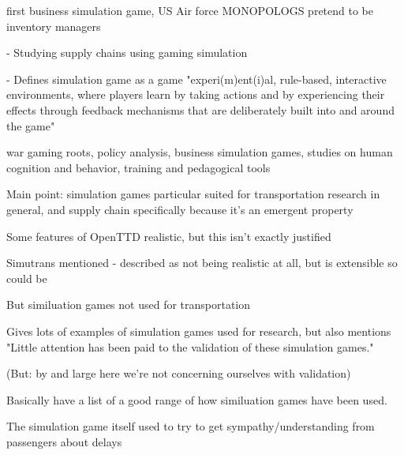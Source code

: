 \documentclass[logo,msc]{infthesis}           %
\begin{document}
\begin{itemize}

\begin{item}
\cite{jackson1959learning} first business simulation game, US Air force MONOPOLOGS pretend to be inventory managers
\end{item}

\begin{item}
\cite{meijer2009organisation} - Studying supply chains using gaming simulation
\end{item}

\begin{item}
\cite{mayer2009gaming} - Defines simulation game as a game "experi(m)ent(i)al, rule-based, interactive environments, where players learn by taking actions and by experiencing their effects through feedback mechanisms that are deliberately built into and around the game"
\end{item}

\begin{item}
\cite{raghothama2013review} war gaming roots, policy analysis, business simulation games, studies on human cognition and behavior, training and pedagogical tools

Main point: simulation games particular suited for transportation research in general, and supply chain specifically because it's an emergent property

Some features of OpenTTD realistic, but this isn't exactly justified

Simutrans mentioned - described as not being realistic at all, but is extensible so could be

But similuation games not used for transportation

Gives lots of examples of simulation games used for research, but also mentions "Little attention has been paid to the validation of these simulation games."

(But: by and large here we're not concerning ourselves with validation)
\end{item}

\begin{item}
Basically have a list of a good range of how similuation games have been used.
\end{item}

\begin{item}
\cite{alderliesten2019maintrain} The simulation game itself used to try to get sympathy/understanding from passengers about delays
\end{item}


\end{itemize}
\end{document}
